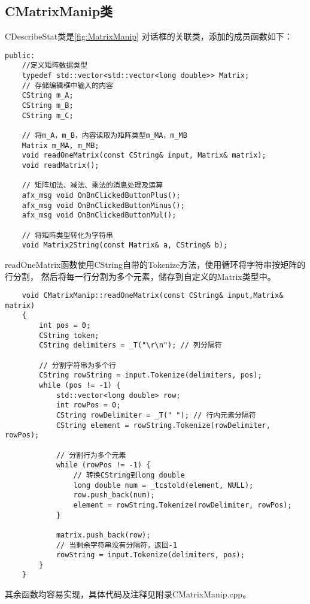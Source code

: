 \subsection{CMatrixManip类}
CDescribeStat类是\autoref{fig:MatrixManip}
对话框的关联类，添加的成员函数如下：
\begin{lstlisting}
public:
    //定义矩阵数据类型
    typedef std::vector<std::vector<long double>> Matrix; 
    // 存储编辑框中输入的内容
	CString m_A;
	CString m_B;
	CString m_C;

    // 将m_A，m_B，内容读取为矩阵类型m_MA，m_MB
    Matrix m_MA, m_MB;
    void readOneMatrix(const CString& input, Matrix& matrix);
    void readMatrix(); 

    // 矩阵加法、减法、乘法的消息处理及运算
	afx_msg void OnBnClickedButtonPlus();
	afx_msg void OnBnClickedButtonMinus();
	afx_msg void OnBnClickedButtonMul();
	
    // 将矩阵类型转化为字符串
	void Matrix2String(const Matrix& a, CString& b);
\end{lstlisting}


readOneMatrix函数使用CString自带的Tokenize方法，使用循环将字符串按矩阵的行分割，
然后将每一行分割为多个元素，储存到自定义的Matrix类型中。
\begin{lstlisting}
    void CMatrixManip::readOneMatrix(const CString& input,Matrix& matrix)
    {
        int pos = 0;
        CString token;
        CString delimiters = _T("\r\n"); // 列分隔符
    
        // 分割字符串为多个行
        CString rowString = input.Tokenize(delimiters, pos);
        while (pos != -1) {
            std::vector<long double> row;
            int rowPos = 0;
            CString rowDelimiter = _T(" "); // 行内元素分隔符
            CString element = rowString.Tokenize(rowDelimiter, rowPos);
    
            // 分割行为多个元素
            while (rowPos != -1) {
                // 转换CString到long double
                long double num = _tcstold(element, NULL); 
                row.push_back(num);
                element = rowString.Tokenize(rowDelimiter, rowPos);
            }
    
            matrix.push_back(row);
            // 当剩余字符串没有分隔符，返回-1
            rowString = input.Tokenize(delimiters, pos); 
        }
    }
\end{lstlisting}
其余函数均容易实现，具体代码及注释见附录CMatrixManip.cpp。


